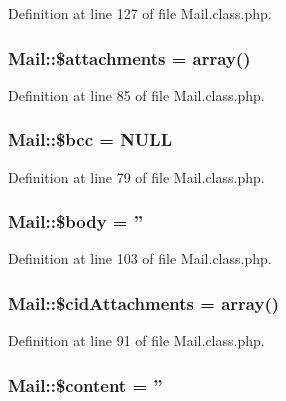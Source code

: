 Definition at line 127 of file Mail.\+class.\+php.

\hypertarget{classMail_a93b05b1003cc8ea16b59c00d77f47466}{
\subsubsection[{\$attachments}]{\setlength{\rightskip}{0pt plus 5cm}Mail\+::\$attachments = array()}}\label{classMail_a93b05b1003cc8ea16b59c00d77f47466}


Definition at line 85 of file Mail.\+class.\+php.

\hypertarget{classMail_a2e25b3c43459422d40765d581b165692}{
\subsubsection[{\$bcc}]{\setlength{\rightskip}{0pt plus 5cm}Mail\+::\$bcc = N\+U\+L\+L}}\label{classMail_a2e25b3c43459422d40765d581b165692}


Definition at line 79 of file Mail.\+class.\+php.

\hypertarget{classMail_acbd542849121b33a76ed63e1c4670e02}{
\subsubsection[{\$body}]{\setlength{\rightskip}{0pt plus 5cm}Mail\+::\$body = ''}}\label{classMail_acbd542849121b33a76ed63e1c4670e02}


Definition at line 103 of file Mail.\+class.\+php.

\hypertarget{classMail_a66c6752b550e4e8fd79a63b62815f48f}{
\subsubsection[{\$cid\+Attachments}]{\setlength{\rightskip}{0pt plus 5cm}Mail\+::\$cid\+Attachments = array()}}\label{classMail_a66c6752b550e4e8fd79a63b62815f48f}


Definition at line 91 of file Mail.\+class.\+php.

\hypertarget{classMail_a5a3320973718a2ca8a3fe798bf79c624}{
\subsubsection[{\$content}]{\setlength{\rightskip}{0pt plus 5cm}Mail\+::\$content = ''}}\label{classMail_a5a3320973718a2ca8a3fe798bf79c624}


